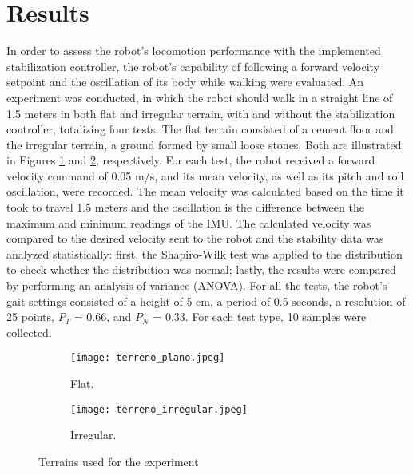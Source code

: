 \documentclass[conference]{IEEEtran}
\begin{document}
\section{Results}

In order to assess the robot's locomotion performance with the implemented stabilization controller, the robot's capability of following a forward velocity setpoint and the oscillation of its body while walking were evaluated. An experiment was conducted, in which the robot should walk in a straight line of 1.5 meters in both flat and irregular terrain, with and without the stabilization controller, totalizing four tests. The flat terrain consisted of a cement floor and the irregular terrain, a ground formed by small loose stones. Both are illustrated in Figures \ref{fig:terreno_plano} and \ref{fig:terreno_irregular}, respectively. For each test, the robot received a forward velocity command of 0.05 m/s, and its mean velocity, as well as its pitch and roll oscillation, were recorded. The mean velocity was calculated based on the time it took to travel 1.5 meters and the oscillation is the difference between the maximum and minimum readings of the IMU. The calculated velocity was compared to the desired velocity sent to the robot and the stability data was analyzed statistically: first, the Shapiro-Wilk test was applied to the distribution to check whether the distribution was normal; lastly, the results were compared by performing an analysis of variance (ANOVA). For all the tests, the robot's gait settings consisted of a height of 5 cm, a period of 0.5 seconds, a resolution of 25 points, $P_T$ = 0.66, and $P_N$ = 0.33. For each test type, 10 samples were collected.

\begin{figure}[htbp]
  \centering
  \begin{subfigure}[htbp]{0.24\textwidth}
    \centering
    \texttt{[image: terreno\_plano.jpeg]}
    \caption{Flat.}
    \label{fig:terreno_plano}
  \end{subfigure}
  \begin{subfigure}[htbp]{0.24\textwidth}
    \centering
    \texttt{[image: terreno\_irregular.jpeg]}
    \caption{Irregular.}
    \label{fig:terreno_irregular}
  \end{subfigure}
  \vfill
  \caption{Terrains used for the experiment}
  \label{fig:terrenos}
\end{figure}
\end{document}
